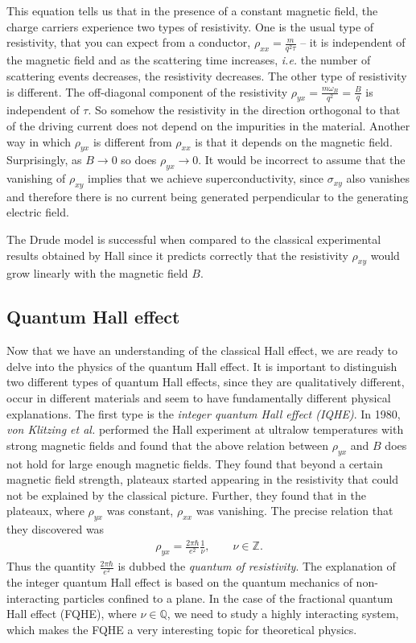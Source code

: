          This equation tells us that in the presence of a constant magnetic field, the charge carriers experience two types of resistivity. One is the usual type of resistivity, that you can expect from a conductor, $\rho_{xx} = \frac{m}{q^2\tau}$ -- it is independent of the magnetic field and as the scattering time increases, \textit{i.e.} the number of scattering events decreases, the resistivity decreases. The other type of resistivity is different. The off-diagonal component of the resistivity $\rho_{yx} = \frac{m \omega_B}{q^2}= \frac{B}{q}$ is independent of $\tau$. So somehow the resistivity in the direction orthogonal to that of the driving current does not depend on the impurities in the material. Another way in which $\rho_{yx}$ is different from $\rho_{xx}$ is that it depends on the magnetic field. Surprisingly, as $B\rightarrow 0$ so does $\rho_{yx} \rightarrow 0$. It would be incorrect to assume that the vanishing of $\rho_{xy}$ implies that we achieve superconductivity, since $\sigma_{xy}$ also vanishes and therefore there is no current being generated perpendicular to the generating electric field.

        The Drude model is successful when compared to the classical experimental results obtained by Hall since it predicts correctly that the resistivity  $\rho_{xy}$ would grow linearly with the magnetic field $B$.
        \subsection{Quantum Hall effect}
        Now that we have an understanding of the classical Hall effect, we are ready to delve into the physics of the quantum Hall effect. It is important to distinguish two different types of quantum Hall effects, since they are qualitatively different, occur in different materials and seem to have fundamentally different physical explanations.
        The first type is the \textit{integer quantum Hall effect (IQHE)}. In 1980, \textit{von Klitzing et al.} \cite{vonKlitzing:1980pdk} performed the Hall experiment at ultralow temperatures with strong magnetic fields and found that the above relation between $\rho_{yx}$ and $B$ does not hold for large enough magnetic fields. They found that beyond a certain magnetic field strength, plateaux started appearing in the resistivity that could not be explained by the classical picture. Further, they found that in the plateaux, where $\rho_{yx}$ was constant, $\rho_{xx}$ was vanishing. The precise relation that they discovered was
        \begin{align}
            \rho_{yx} = \frac{2 \pi \hbar}{e^2} \frac{1}{\nu}, \qquad \nu \in \mathbb{Z}.
        \end{align}
        Thus the quantity $\frac{2 \pi \hbar}{e^2}$ is dubbed the \textit{quantum of resistivity}. The explanation of the integer quantum Hall effect is based on the quantum mechanics of non-interacting particles confined to a plane. In the case of the fractional quantum Hall effect (FQHE), where $\nu \in \mathbb{Q}$, we need to study a highly interacting system, which makes the FQHE a very interesting topic for theoretical physics.

